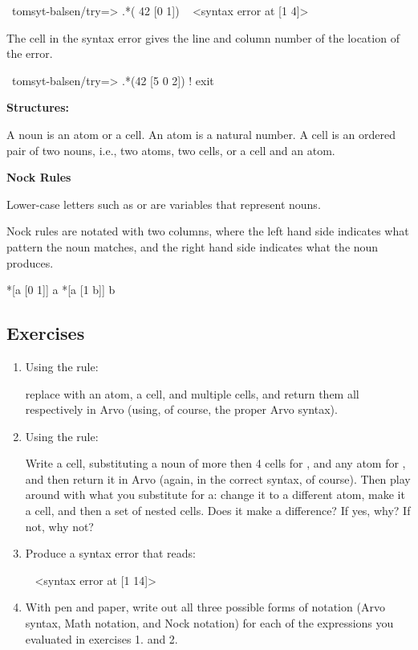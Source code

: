 \begin{code}
~tomsyt-balsen/try=> .*( 42 [0 1])
~ <syntax error at [1 4]>
\end{code}

The cell in the syntax error gives the line and column number of the location of the error.

\begin{code}
~tomsyt-balsen/try=> .*(42 [5 0 2])
! exit
\end{code}

\textbf{Structures:}

A noun is an atom or a cell.  An atom is a natural number.  A cell is an
ordered pair of two nouns, i.e., two atoms, two cells, or a cell and an atom.

\textbf{Nock Rules}

Lower-case letters such as  or  are variables that represent nouns.

Nock rules are notated with two columns, where the left hand side indicates
what pattern the noun matches, and the right hand side indicates what the noun
produces.
\begin{code}
*[a [0 1]]                  a
*[a [1 b]]                  b
\end{code}

\subsection{Exercises}

\begin{enumerate}
\item Using the rule:


replace  with an atom, a cell, and multiple cells, and return them all respectively in Arvo (using, of course, the proper Arvo syntax).  
\item Using the rule:

 Write a cell, substituting a noun of more then 4 cells for , and any atom for , and then return it in Arvo (again, in the correct syntax, of course). Then play around with what you substitute for a: change it to a different atom, make it a cell, and then a set of nested cells. Does it make a difference? If yes, why? If not, why not?
\item Produce a syntax error that reads:
\begin{code}
~ <syntax error at [1 14]>
\end{code}
\item With pen and paper, write out all three possible forms of notation (Arvo syntax, Math notation, and Nock notation) for each
of the expressions you evaluated in exercises 1. and 2.
\end{enumerate}

